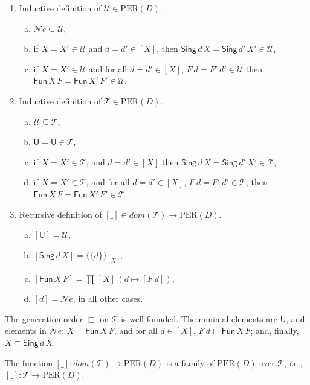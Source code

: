 \documentclass{LMCS}
\theoremstyle{plain}\newtheorem{satz}[thm]{Satz}
\newcommand{\LONGVERSION}[1]{#1}
\newcommand{\SHORTVERSION}[1]{}
\newcommand{\into}{\rightarrow}
\newcommand{\singD}[2]{\{\!\!\{#1\}\!\!\}_{#2}}
\newcommand{\dom}{\mathit{dom}}
\newcommand{\vdom}{\dom}
\newcommand{\perD}{\mbox{PER}(D)}
\newcommand{\perne}{\mathord{\mathcal{N}\!\mathit{e}}}
\newcommand{\perU}{\mathcal{U}}
\newcommand{\perT}{\mathcal{T}}
\newcommand{\iU}{\mathsf{U}}
\newcommand{\iPi}[2]{\mathsf{Fun}\,#1\,#2}
\newcommand{\iSing}[2]{\mathsf{Sing}\,#1\,{#2}}
\newcommand{\LONGVERSION}[1]{}
\newcommand{\SHORTVERSION}[1]{#1}
\newcommand{\LONGSHORT}[2]{\LONGVERSION{#1}\SHORTVERSION{#2}}
\begin{document}
\begin{defi}\label{def:peru}\hfill
\begin{enumerate}[(1)]
\item Inductive definition of $\perU \in \perD$.\hfill
  \begin{enumerate}[(a)]
  \item $\perne \subseteq \perU$,
  \item if $X = X' \in \perU$ and $d = d'\in [X]$, then $\iSing{d}{X}
    = \iSing{d'}{X'} \in \perU$,
  \item if $X = X'\in \perU$ and for all $d = d' \in [X]$, $F\ d = F'\
    d' \in \perU$ then $\iPi{X}{F} = \iPi{X'}{F'}\in \perU$.
  \end{enumerate}
\item Inductive definition of $\perT \in \perD$.\hfill
  \begin{enumerate}[(a)]
  \item $\perU \subseteq \perT$,
  \item $\iU = \iU \in \perT$,
  \item if $X = X' \in \perT$, and $d = d' \in [X]$ then $\iSing{d}{X}
    = \iSing{d'}{X'}\in \perT$,
  \item if $X = X' \in \perT$, and for all $d = d' \in [X]$, $F\ d =
    F'\ d'\in\perT$, then $\iPi{X}{F} = \iPi{X'}{F'}\in \perT$.
  \end{enumerate}
\item Recursive definition of $[\_] \in \vdom(\perT) \to \perD$.\hfill
  \begin{enumerate}[(a)]
  \item $[\iU] = \perU$,
  \item $[\iSing{d}{X}]= \singD{d}{[X]}$,
  \item $[\iPi{X}{F}] = \prod\,[X]\,(d\mapsto [F\ d])$,
  \item $[d] = \perne$, in all other cases.
  \end{enumerate}
\end{enumerate}
\end{defi}


\LONGVERSION{
\begin{rem}
  \label{rem:ord-pert}
  The generation order $\sqsubset$ on $\perT$ is well-founded. The
  minimal elements are $\iU$, and elements in $\perne$; $X \sqsubset
  \iPi{X}{F}$, and for all $d\in [X]$, $F\ d\sqsubset \iPi{X}{F}$;
  and, finally, $X \sqsubset \iSing{d}{X}$.
\end{rem}
}

\begin{lem}
  \label{lem:famperd}
\LONGSHORT{
  The function $[\_] : dom(\perT) \into \perD$ is a family of
  $\perD$ over $\perT$, i.e., $[\_] : \perT \into \perD$.
}{
  The function $[\_]$ is a family of $\perD$ over $\perT$.  
}
\end{lem}
\end{document}
